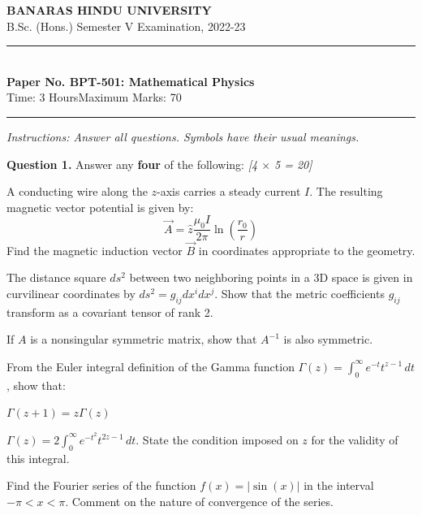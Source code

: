 \documentclass[11pt,a4paper]{article}
\newcommand{\pts}[1]{\hfill   \textit{[#1]}}
\begin{document}
\begin{center}
  {\large\bfseries BANARAS HINDU UNIVERSITY}\\[2pt]
  {\normalsize B.Sc. (Hons.) Semester V Examination, 2022-23}\\[6pt]
  \rule{0.8\linewidth}{0.5pt}\\[6pt]
  {\large\bfseries Paper No. BPT-501: Mathematical Physics}\\[4pt]
  {\normalsize Time: 3 Hours\hfill Maximum Marks: 70}
\end{center}
\rule{\linewidth}{0.4pt}
\smallskip



\noindent   \textit{Instructions: Answer all questions. Symbols have their usual meanings.}
\bigskip




\noindent   \textbf{Question 1.} Answer any   \textbf{four} of the following: \pts{4 $ \times$ 5 = 20}

\begin{parts}
  \item A conducting wire along the $z$-axis carries a steady current $I$. The resulting magnetic vector potential is given by:
    \[ \vec{A} = \hat{z} \frac{\mu_0 I}{2\pi} \ln \left( \frac{r_0}{r} \right) \]
    Find the magnetic induction vector $\vec{B}$ in coordinates appropriate to the geometry.
  \item The distance square $ds^2$ between two neighboring points in a 3D space is given in curvilinear coordinates by $ds^2 = g_{ij} dx^i dx^j$. Show that the metric coefficients $g_{ij}$ transform as a covariant tensor of rank 2.
  \item If $A$ is a nonsingular symmetric matrix, show that $A^{-1}$ is also symmetric.
  \item From the Euler integral definition of the Gamma function $\Gamma(z) = \int_0^{\infty} e^{-t} t^{z-1} \, dt$, show that:
    
\begin{parts}
      \item $\Gamma(z+1) = z \Gamma(z)$
      \item $\Gamma(z) = 2 \int_0^{\infty} e^{-t^2} t^{2z-1} \, dt$. State the condition imposed on $z$ for the validity of this integral.
    \end{parts}
  \item Find the Fourier series of the function $f(x) = |\sin(x)|$ in the interval $-\pi < x < \pi$. Comment on the nature of convergence of the series.
\end{parts}
\end{document}
